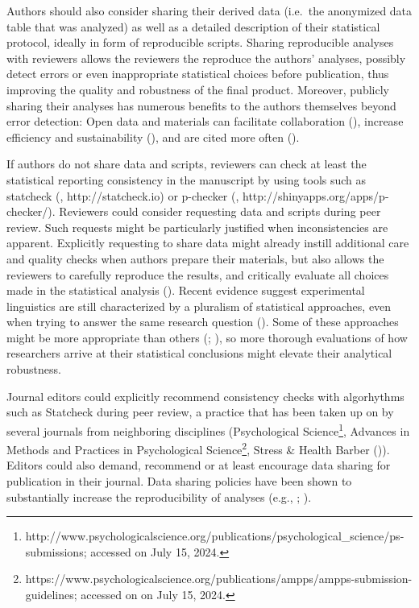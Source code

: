 \documentclass[
  doc,
  longtable,
  nolmodern,
  notxfonts,
  notimes,
  colorlinks=true,linkcolor=blue,citecolor=blue,urlcolor=blue]{apa7}
\begin{document}
Authors should also consider sharing their derived data (i.e.~the
anonymized data table that was analyzed) as well as a detailed
description of their statistical protocol, ideally in form of
reproducible scripts. Sharing reproducible analyses with reviewers
allows the reviewers the reproduce the authors' analyses, possibly
detect errors or even inappropriate statistical choices before
publication, thus improving the quality and robustness of the final
product. Moreover, publicly sharing their analyses has numerous benefits
to the authors themselves beyond error detection: Open data and
materials can facilitate collaboration
(), increase efficiency
and sustainability (), and are cited more often
().

If authors do not share data and scripts, reviewers can check at least
the statistical reporting consistency in the manuscript by using tools
such as statcheck (, http://statcheck.io) or p-checker
(,
http://shinyapps.org/apps/p-checker/). Reviewers could consider
requesting data and scripts during peer review. Such requests might be
particularly justified when inconsistencies are apparent. Explicitly
requesting to share data might already instill additional care and
quality checks when authors prepare their materials, but also allows the
reviewers to carefully reproduce the results, and critically evaluate
all choices made in the statistical analysis
(). Recent
evidence suggest experimental linguistics are still characterized by a
pluralism of statistical approaches, even when trying to answer the same
research question (). Some of these approaches might be more appropriate than
others (; ), so
more thorough evaluations of how researchers arrive at their statistical
conclusions might elevate their analytical robustness.

Journal editors could explicitly recommend consistency checks with
algorhythms such as Statcheck during peer review, a practice that has
been taken up on by several journals from neighboring disciplines
(Psychological Science\footnote{http://www.psychologicalscience.org/publications/psychological\_science/ps-submissions;
  accessed on July 15, 2024.}, Advances in Methods and Practices in
Psychological Science\footnote{https://www.psychologicalscience.org/publications/ampps/ampps-submission-guidelines;
  accessed on on July 15, 2024.}, Stress \& Health Barber
()). Editors could also demand,
recommend or at least encourage data sharing for publication in their
journal. Data sharing policies have been shown to substantially increase
the reproducibility of analyses (e.g.,
;
).
\end{document}
